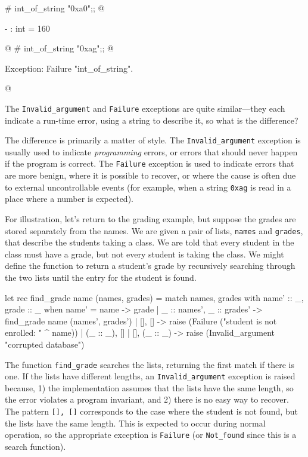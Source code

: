 \begin{ocaml}
# int_of_string "0xa0";;
@
\begin{topoutput}
- : int = 160
\end{topoutput}
@
# int_of_string "0xag";;
@
\begin{toperror}
Exception: Failure "int_of_string".
\end{toperror}
@
\end{ocaml}
%
The \hbox{\lstinline/Invalid_argument/} and \hbox{\lstinline/Failure/} exceptions are quite similar---they each indicate a
run-time error, using a string to describe it, so what is the difference?

The difference is primarily a matter of style.  The \hbox{\lstinline/Invalid_argument/} exception is
usually used to indicate \emph{programming} errors, or errors that should never happen if the
program is correct.  The \hbox{\lstinline/Failure/} exception is used to indicate errors that are more
benign, where it is possible to recover, or where the cause is often due to external uncontrollable
events (for example, when a string \hbox{\lstinline/0xag/} is read in a place where a number is expected).

For illustration, let's return to the grading example, but suppose the grades are stored separately
from the names.  We are given a pair of lists, \hbox{\lstinline/names/} and \hbox{\lstinline/grades/}, that
describe the students taking a class.  We are told that every student in the class must have a
grade, but not every student is taking the class.  We might define the function to return a
student's grade by recursively searching through the two lists until the entry for the student is
found.

\begin{ocaml}
let rec find_grade name (names, grades) =
   match names, grades with
      name' :: _, grade :: _ when name' = name -> grade
    | _ :: names', _ :: grades' -> find_grade name (names', grades')
    | [], [] -> raise (Failure ("student is not enrolled: " ^ name))
    | (_ :: _), [] | [], (_ :: _) -> raise (Invalid_argument "corrupted database")
\end{ocaml}
%
The function \hbox{\lstinline/find_grade/} searches the lists, returning the first match if there is
one.  If the lists have different lengths, an \hbox{\lstinline/Invalid_argument/} exception is raised
because, 1) the implementation assumes that the lists have the same length, so the error violates a
program invariant, and 2) there is no easy way to recover.  The pattern \hbox{\lstinline/[], []/}
corresponds to the case where the student is not found, but the lists have the same length.  This is
expected to occur during normal operation, so the appropriate exception is \hbox{\lstinline/Failure/}
(or \hbox{\lstinline/Not_found/} since this is a search function).

